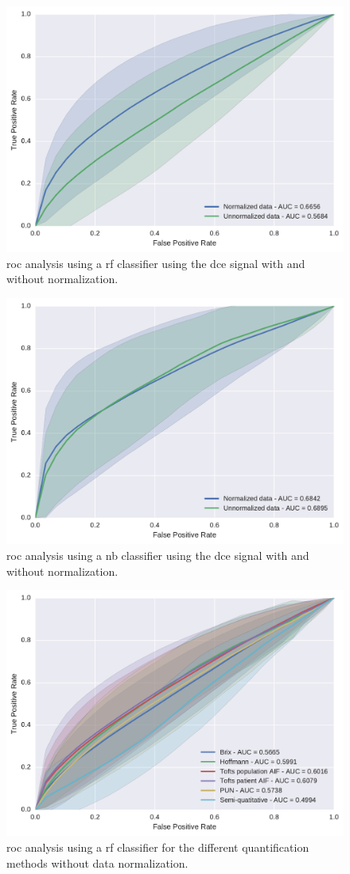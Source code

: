 \begin{figure}
  \centering
  \includegraphics[width=0.7\linewidth]{03_experiments/figures/rf.pdf}
  \caption{\acs*{roc} analysis using a \acs*{rf} classifier using the \ac{dce} signal with and without normalization.}
  \label{fig:rfunorm}
\end{figure}

\begin{figure}
  \centering
  \includegraphics[width=0.7\linewidth]{03_experiments/figures/nb.pdf}
  \caption{\acs*{roc} analysis using a \acs*{nb} classifier using the \ac{dce} signal with and without normalization.}
  \label{fig:rfunorm}
\end{figure}

\begin{figure}
  \centering
  \includegraphics[width=0.7\linewidth]{03_experiments/figures/unormalized/rf.pdf}
  \caption{\acs*{roc} analysis using a \acs*{rf} classifier for the different quantification methods without data normalization.}
  \label{fig:rfunorm}
\end{figure}

